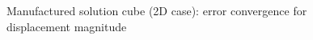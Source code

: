 \documentclass[sn-mathphys,Numbered]{sn-jnl}%
\begin{document}
\begin{figure}[H]
{    }
 	\caption{Manufactured solution cube (2D case): error convergence for displacement magnitude}
 	\label{fig:cell}
 \end{figure}
 
\end{document}
